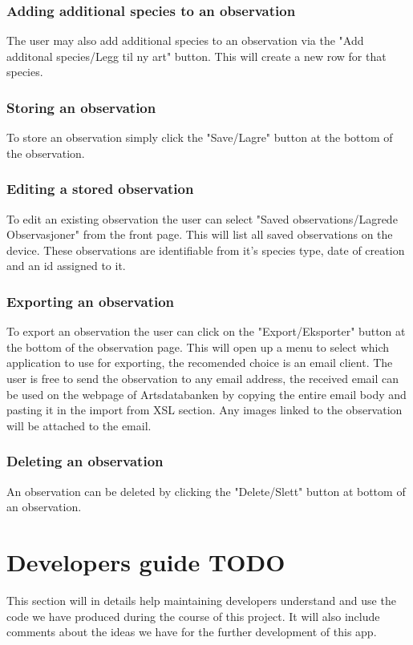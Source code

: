 \subsubsection{Adding additional species to an observation}
The user may also add additional species to an observation via the "Add additonal species/Legg til ny art" button. This will create a new row for that species.

\subsubsection{Storing an observation}
To store an observation simply click the "Save/Lagre" button at the bottom of the observation.

\subsubsection{Editing a stored observation}
To edit an existing observation the user can select "Saved observations/Lagrede Observasjoner" from the front page. 
This will list all saved observations on the device. 
These observations are identifiable from it's species type, date of creation and an id assigned to it.

\subsubsection{Exporting an observation}
To export an observation the user can click on the "Export/Eksporter" button at the bottom of the observation page.
This will open up a menu to select which application to use for exporting, the recomended choice is an email client.
The user is free to send the observation to any email address, the received email can be used on the webpage of Artsdatabanken by copying the entire email body and pasting it in the import from XSL section.
Any images linked to the observation will be attached to the email.

\subsubsection{Deleting an observation}
An observation can be deleted by clicking the "Delete/Slett" button at bottom of an observation.

\section{Developers guide TODO}
This section will in details help maintaining developers understand and use the code we have produced during the course of this project. It will also include comments about the ideas we have for the further development of this app.

